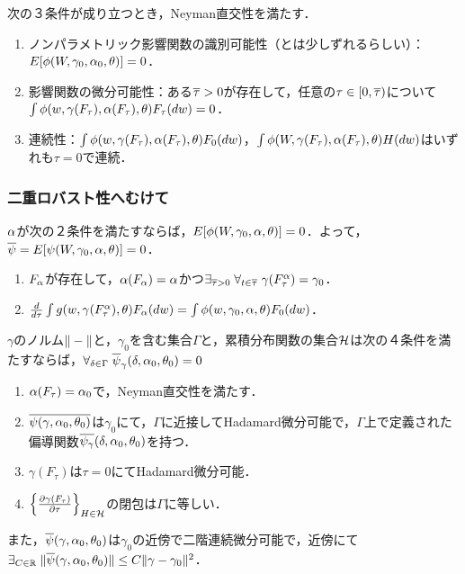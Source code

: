 \documentclass[uplatex,dvipdfmx]{jsreport}
\begin{document}
\begin{theorem}
    次の３条件が成り立つとき，Neyman直交性を満たす．
    \begin{enumerate}
        \item ノンパラメトリック影響関数の識別可能性（とは少しずれるらしい）：$E[\phi(W,\gamma_0,\alpha_0,\theta)]=0$．
        \item 影響関数の微分可能性：ある$\overline{\tau}>0$が存在して，任意の$\tau\in[0,\overline{\tau})$について$\int\phi(w,\gamma(F_\tau),\alpha(F_\tau),\theta)F_\tau(dw)=0$．
        \item 連続性：$\int\phi(w,\gamma(F_\tau),\alpha(F_\tau),\theta)F_0(dw)$，$\int\phi(W,\gamma(F_\tau),\alpha(F_\tau),\theta)H(dw)$はいずれも$\tau=0$で連続．
    \end{enumerate}
\end{theorem}

\subsubsection{二重ロバスト性へむけて}

\begin{theorem}[$\al$の十分条件]
    $\al$が次の２条件を満たすならば，$E[\phi(W,\gamma_0,\alpha,\theta)]=0$．よって，$\overline{\psi}=E[\psi(W,\gamma_0,\alpha,\theta)]=0$．
    \begin{enumerate}
        \item $F_\alpha$が存在して，$\alpha(F_\alpha)=\alpha$かつ$\exists_{\overline{\tau}>0}\;\forall_{t\in\overline{\tau}}\;\gamma(F^\alpha_\tau)=\gamma_0$．
        \item $\frac{d }{d \tau}\int g(w,\gamma(F^\alpha_\tau),\theta)F_\alpha(dw)=\int\phi(w,\gamma_0,\alpha,\theta)F_0(dw)$．
    \end{enumerate}
\end{theorem}

\begin{theorem}\label{thm-3}
    $\gamma$のノルム$\|-\|$と，$\gamma_0$を含む集合$\Gamma$と，累積分布関数の集合$\mathcal{H}$は次の４条件を満たすならば，$\forall_{\delta\in\Gamma}\;\overline{\psi}_\gamma(\delta,\alpha_0,\theta_0)=0$
    \begin{enumerate}
        \item $\alpha(F_\tau)=\alpha_0$で，Neyman直交性を満たす．
        \item $\overline{\psi(\gamma,\alpha_0,\theta_0)}$は$\gamma_0$にて，$\Gamma$に近接してHadamard微分可能で，$\Gamma$上で定義された偏導関数$\overline{\psi_\gamma}(\delta,\alpha_0,\theta_0)$を持つ．
        \item $\gamma(F_\tau)$は$\tau=0$にてHadamard微分可能．
        \item $\left\{\frac{\partial \gamma(F_\tau)}{\partial \tau}\right\}_{H\in\mathcal{H}}$の閉包は$\Gamma$に等しい．
    \end{enumerate}
    また，$\overline{\psi}(\gamma,\alpha_0,\theta_0)$は$\gamma_0$の近傍で二階連続微分可能で，近傍にて$\exists_{C\in\mathbb{R}}\;\|\overline{\psi}(\gamma,\alpha_0,\theta_0)\|\le C\|\gamma-\gamma_0\|^2$．
\end{theorem}
\end{document}
